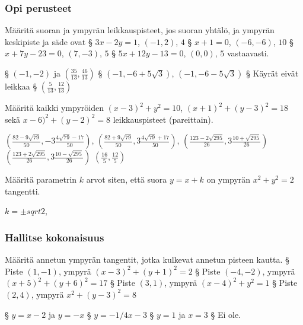 \begin{tehtavasivu}

\subsubsection*{Opi perusteet}

\begin{tehtava}
Määritä suoran ja ympyrän leikkauspisteet, jos suoran yhtälö, ja ympyrän keskipiste ja säde ovat
\alakohdat
§ $3x-2y = 1$, $(-1,2)$, $4$
§ $x+1 = 0$, $(-6,-6)$, $10$
§ $x+7y-23 = 0$, $(7,-3)$, $5$
§ $5x+12y-13 = 0$, $(0,0)$, $5$
\loppu
vastaavasti.
\begin{vastaus}
\alakohdat
§ $(-1,-2)$ ja $(\frac{35}{13},\frac{46}{13})$
§ $(-1,-6+5\sqrt{3})$, $(-1,-6-5\sqrt{3})$
§ Käyrät eivät leikkaa
§ $(\frac{5}{13},\frac{12}{13})$
\loppu
\end{vastaus}
\end{tehtava}

\begin{tehtava}
Määritä kaikki ympyröiden $ (x-3)^2+y^2= 10$, $(x+1)^2+(y-3)^2 = 18$ sekä $x-6)^2+(y-2)^2 = 8$ leikkauspisteet (pareittain).
\begin{vastaus}
$(\frac{82-9\sqrt{79}}{50},-3\frac{4\sqrt{79}-17}{50})$, $(\frac{82+9\sqrt{79}}{50},3\frac{4\sqrt{79}+17}{50})$,
$(\frac{123-2\sqrt{295}}{26}, 3\frac{10+\sqrt{295}}{26})$
$(\frac{123+2\sqrt{295}}{26}, 3\frac{10-\sqrt{295}}{26})$
$(\frac{16}{5}, \frac{12}{5})$
\end{vastaus}
\end{tehtava}

\begin{tehtava}
Määritä parametrin $k$ arvot siten, että suora $y=x+k$ on ympyrän  $ x^2+y^2= 2$ tangentti.
\begin{vastaus}
$k = \pm sqrt{2} $,
\end{vastaus}
\end{tehtava}


\subsubsection*{Hallitse kokonaisuus}
\begin{tehtava}
	Määritä annetun ympyrän tangentit, jotka kulkevat annetun pisteen kautta.
	\alakohdat
		§ Piste $(1, -1)$, ympyrä $(x-3)^2 + (y+1)^2 = 2$
		§ Piste $(-4, -2)$, ympyrä $(x+5)^2 + (y+6)^2 = 17$
		§ Piste $(3, 1)$, ympyrä $(x-4)^2 + y^2 = 1$
		§ Piste $(2, 4)$, ympyrä $x^2 + (y-3)^2 = 8$
	\loppu
	\begin{vastaus}
		\alakohdat
			§ $y=x-2$ ja $y=-x$
			§ $y= -1/4 x -3$
			§ $y=1$ ja $x=3$
			§ Ei ole.
		\loppu
	\end{vastaus}
\end{tehtava}


\end{tehtavasivu}
